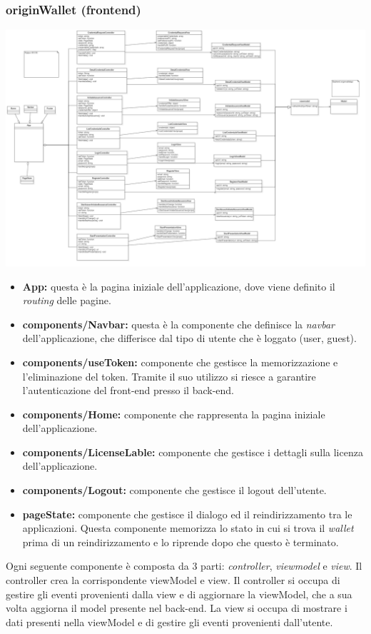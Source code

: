 \subsubsection{originWallet (frontend)}
\includegraphics[scale=0.2]{./res/img/frontendwallet.png}
\begin{itemize}
    \item \textbf{App:} questa è la pagina iniziale dell'applicazione, dove viene definito il \textit{routing} delle pagine.
    \item \textbf{components/Navbar:} questa è la componente che definisce la \textit{navbar} dell'applicazione, che differisce dal tipo di utente che è loggato (user, guest).
    \item \textbf{components/useToken:} componente che gestisce la memorizzazione e l'eliminazione del token. Tramite il suo utilizzo si riesce a garantire l'autenticazione del front-end presso il back-end.
    \item \textbf{components/Home:} componente che rappresenta la pagina iniziale dell'applicazione.
    \item \textbf{components/LicenseLable:} componente che gestisce i dettagli sulla licenza dell'applicazione.
    \item \textbf{components/Logout:} componente che gestisce il logout dell'utente.  
    \item \textbf{pageState:} componente che gestisce il dialogo ed il reindirizzamento tra le applicazioni. Questa componente memorizza lo stato in cui si trova il \textit{wallet} prima di un reindirizzamento e lo riprende dopo che questo è terminato.
\end{itemize}

Ogni seguente componente è composta da 3 parti: \textit{controller}, \textit{viewmodel} e \textit{view}. Il controller crea la corrispondente
viewModel e view. Il controller si occupa di gestire gli eventi provenienti dalla view e di aggiornare la viewModel, che a sua volta aggiorna 
il model presente nel back-end. La view si occupa di mostrare i dati presenti nella viewModel e di gestire gli eventi provenienti dall'utente.

